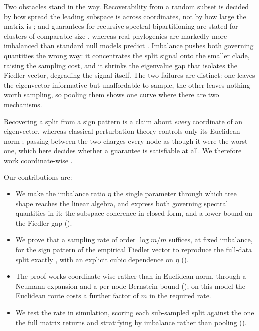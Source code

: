 Two obstacles stand in the way. Recoverability from a random subset is decided by how
spread the leading subspace is across coordinates, not by how
large the matrix is \cite{chen2014completing}; and guarantees for recursive
spectral bipartitioning are stated for clusters of comparable size
\cite{Balakrishnan2011clustering, qinrohe2013regularized}, whereas real
phylogenies are markedly more imbalanced than standard null models predict
\cite{blum2006which, yule1925mathematical, kingman1982coalescent,
steel2001properties, aldous2001stochastic}. Imbalance pushes both governing
quantities the wrong way: it concentrates the split signal onto the smaller clade,
raising the sampling cost, and it shrinks the eigenvalue gap that isolates the
Fiedler vector, degrading the signal itself. The two failures are distinct:
one leaves the eigenvector informative but unaffordable to sample, the other
leaves nothing worth sampling, so pooling them shows one curve where there are
two mechanisms.

Recovering a split from a sign pattern is a claim about \emph{every} coordinate
of an eigenvector, whereas classical perturbation theory controls only its
Euclidean norm \cite{davis1970rotation};
passing between the two charges every node as though it were the worst one, which
here decides whether a guarantee is satisfiable at all. We therefore work
coordinate-wise \cite{eldridge2017unperturbed, fan2018eigenvector,
abbe2020entrywise, tropp2012userfriendly}.

Our contributions are:
\begin{itemize}
\item We make the imbalance ratio $\eta$ the single parameter through which tree
shape reaches the linear algebra, and express both governing spectral quantities
in it: the subspace coherence in closed form, and a lower bound on the Fiedler
gap ().

\item We prove that a sampling rate of order $\log m/m$ suffices, at fixed
imbalance, for the sign pattern of the empirical Fiedler vector to reproduce the
full-data split exactly \hp, with an explicit cubic dependence on $\eta$
(). 

\item The proof works coordinate-wise rather than in Euclidean norm, through a
Neumann expansion and a per-node Bernstein bound (); on this
model the Euclidean route costs a further factor of $m$ in the required rate.

\item We test the rate in simulation, scoring each sub-sampled split against the one the full
matrix returns \cite{strehlghosh2002cluster, fortunato2010community} and stratifying by imbalance
rather than pooling ().
\end{itemize}

